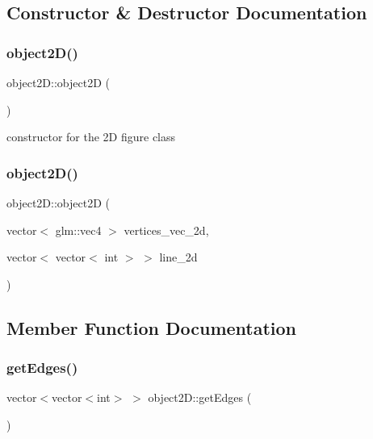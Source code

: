 \subsection{Constructor \& Destructor Documentation}
\mbox{\label{classobject2D_a2169d77e7375f31356d2524c26c0a63f}} 
\subsubsection{\texorpdfstring{object2\+D()}{object2D()}\hspace{0.1cm}{\footnotesize\ttfamily [1/2]}}
{\footnotesize\ttfamily object2\+D\+::object2D (\begin{DoxyParamCaption}{ }\end{DoxyParamCaption})}

constructor for the 2D figure class \mbox{\label{classobject2D_a7c2dd1d0bae14f68311ffa3194c7b848}} 
\subsubsection{\texorpdfstring{object2\+D()}{object2D()}\hspace{0.1cm}{\footnotesize\ttfamily [2/2]}}
{\footnotesize\ttfamily object2\+D\+::object2D (\begin{DoxyParamCaption}\item[{vector$<$ glm\+::vec4 $>$}]{vertices\+\_\+vec\+\_\+2d,  }\item[{vector$<$ vector$<$ int $>$ $>$}]{line\+\_\+2d }\end{DoxyParamCaption})}



\subsection{Member Function Documentation}
\mbox{\label{classobject2D_a22bb00cbc061128b26645e6cdf7a2117}} 
\subsubsection{\texorpdfstring{get\+Edges()}{getEdges()}}
{\footnotesize\ttfamily vector$<$vector$<$int$>$ $>$ object2\+D\+::get\+Edges (\begin{DoxyParamCaption}{ }\end{DoxyParamCaption})}

